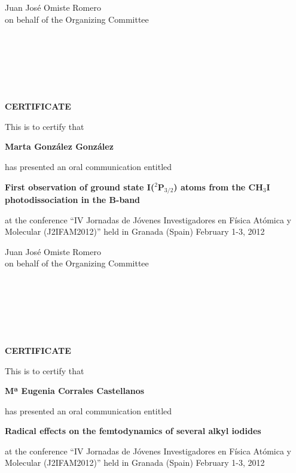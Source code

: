 \documentclass [13pt,a4paper] {letter}
\begin{document}
\vspace {3cm}
\begin{raggedleft}
Juan José Omiste Romero\\
on behalf of the Organizing Committee
\newpage
\end{raggedleft}
\begin{verbatim}






\end{verbatim}
\pagestyle{empty}
\begin{center}
{\bf {\Huge CERTIFICATE}}

\vspace {1.5cm}
This is to certify that
\vspace {1cm}

{\bf \Large  Marta  González  González }
\vspace {1cm}

has presented an oral communication entitled
\vspace {1cm}

{\bf \large  First observation of ground state I($^2$P$_{3/2}$) atoms from the CH$_3$I photodissociation in the B-band }
\vspace {1cm}

at the conference { \textquotedblleft IV Jornadas de Jóvenes Investigadores en Física Atómica y Molecular (J2IFAM2012)\textquotedblright} 
held in Granada (Spain) February 1-3, 2012
\end{center}
\vspace {3cm}
\begin{raggedleft}
Juan José Omiste Romero\\
on behalf of the Organizing Committee
\newpage
\end{raggedleft}
\begin{verbatim}






\end{verbatim}
\pagestyle{empty}
\begin{center}
{\bf {\Huge CERTIFICATE}}

\vspace {1.5cm}
This is to certify that
\vspace {1cm}

{\bf \Large  Mª Eugenia  Corrales  Castellanos }
\vspace {1cm}

has presented an oral communication entitled
\vspace {1cm}

{\bf \large  Radical effects on the femtodynamics of several alkyl iodides }
\vspace {1cm}

at the conference { \textquotedblleft IV Jornadas de Jóvenes Investigadores en Física Atómica y Molecular (J2IFAM2012)\textquotedblright} 
held in Granada (Spain) February 1-3, 2012
\end{center}
\end{document}
